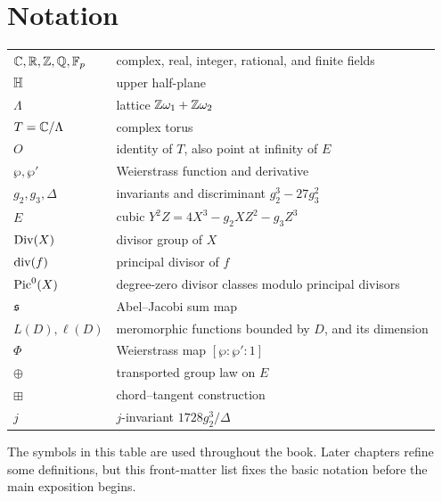 \chapter*{Notation}
\label{front:notation}

\begin{center}
\begin{tabular}{@{}ll@{}}
\(\mathbb{C},\mathbb{R},\mathbb{Z},\mathbb{Q},\mathbb{F}_p\) & complex, real, integer, rational, and finite fields\\
\(\mathbb{H}\) & upper half-plane\\
\(\Lambda\) & lattice \(\mathbb{Z}\omega_1+\mathbb{Z}\omega_2\)\\
\(T=\mathbb{C}/\Lambda\) & complex torus\\
\(O\) & identity of \(T\), also point at infinity of \(E\)\\
\(\wp,\wp'\) & Weierstrass function and derivative\\
\(g_2,g_3,\Delta\) & invariants and discriminant \(g_2^3-27g_3^2\)\\
\(E\) & cubic \(Y^2Z=4X^3-g_2XZ^2-g_3Z^3\)\\
\(\operatorname{Div}(X)\) & divisor group of \(X\)\\
\(\operatorname{div}(f)\) & principal divisor of \(f\)\\
\(\operatorname{Pic}^0(X)\) & degree-zero divisor classes modulo principal divisors\\
\(\mathfrak{s}\) & Abel--Jacobi sum map\\
\(L(D),\ell(D)\) & meromorphic functions bounded by \(D\), and its dimension\\
\(\Phi\) & Weierstrass map \([\wp:\wp':1]\)\\
\(\oplus\) & transported group law on \(E\)\\
\(\boxplus\) & chord--tangent construction\\
\(j\) & \(j\)-invariant \(1728g_2^3/\Delta\)\\
\end{tabular}
\end{center}

\noindent
The symbols in this table are used throughout the book.  Later chapters refine
some definitions, but this front-matter list fixes the basic notation before the
main exposition begins.
